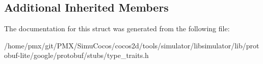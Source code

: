 \subsection*{Additional Inherited Members}


The documentation for this struct was generated from the following file\+:\begin{DoxyCompactItemize}
\item 
/home/pmx/git/\+P\+M\+X/\+Simu\+Cocos/cocos2d/tools/simulator/libsimulator/lib/protobuf-\/lite/google/protobuf/stubs/type\+\_\+traits.\+h\end{DoxyCompactItemize}
